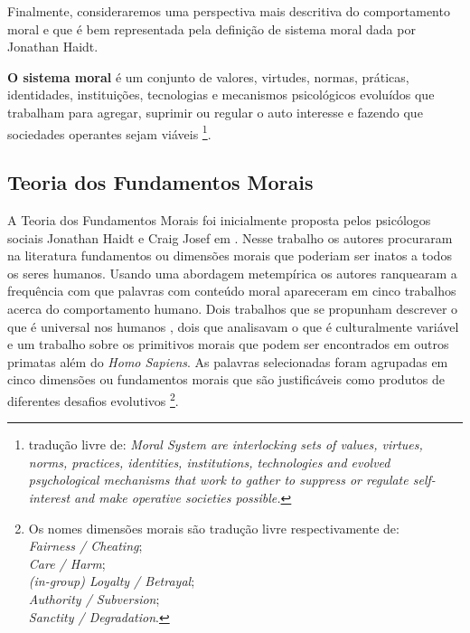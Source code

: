 Finalmente, consideraremos uma perspectiva mais descritiva do comportamento
moral e que é bem representada pela definição de sistema moral dada por
Jonathan Haidt.
\begin{description}
    \item
        \textbf{O sistema moral} é um conjunto de valores, virtudes, normas,
        práticas, identidades, instituições, tecnologias e mecanismos
        psicológicos evoluídos que trabalham para agregar, suprimir ou regular
        o auto interesse e fazendo que sociedades operantes sejam viáveis
        \footnote{ tradução livre de:\textit{ Moral System are interlocking
        sets of values, virtues, norms, practices, identities, institutions,
        technologies and evolved psychological mechanisms that work to gather
        to suppress or regulate self-interest and make operative societies
        possible.} }.
\end{description}


\subsection{Teoria dos Fundamentos Morais}%

A Teoria dos Fundamentos Morais foi inicialmente proposta pelos psicólogos
sociais Jonathan Haidt e Craig Josef em . Nesse trabalho
os autores procuraram na literatura fundamentos ou dimensões morais
que poderiam ser inatos a todos os seres humanos. Usando uma abordagem
metempírica os autores ranquearam a frequência com que palavras com
conteúdo moral apareceram em cinco trabalhos acerca do comportamento
humano. Dois trabalhos que se propunham descrever o que é universal
nos humanos \citep{Brown1991,Fiske1991}, dois que analisavam o que  é
culturalmente variável\citep{Schwartz1990,Shweder1997a} e um trabalho sobre
os primitivos morais que podem ser encontrados em outros primatas  além
do \textit{Homo Sapiens}\citep{Waal1997}.  As palavras selecionadas foram
agrupadas em cinco dimensões ou fundamentos morais que são justificáveis
como produtos de diferentes desafios evolutivos
\footnote{
    Os nomes dimensões morais são tradução livre respectivamente de:\\
    \textit{Fairness / Cheating};\\ \textit{Care / Harm};\\
    \textit{(in-group) Loyalty / Betrayal}; \\
    \textit{Authority / Subversion};\\ \textit{Sanctity / Degradation}.}.

